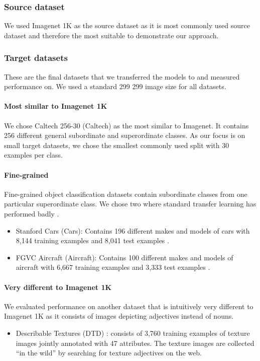 \documentclass[]{article}
\begin{document}
\subsubsection{Source dataset}

We used Imagenet 1K as the source dataset as it is most commonly used
source dataset and therefore the most suitable to demonstrate our approach.

\subsubsection{Target datasets}

These are the final datasets that we transferred the models to
and measured performance on. We used a standard 299  299
image size for all datasets.
\paragraph{Most similar to Imagenet 1K}
We chose Caltech 256-30 (Caltech) \cite{griffin2007caltech} as the most similar to Imagenet. It contains 256 different general subordinate and superordinate classes. As our focus is on small target datasets, we chose the smallest commonly used split with 30 examples per class.  

\paragraph{Fine-grained}

Fine-grained object classification datasets contain subordinate classes
from one particular superordinate class. We chose two where standard
transfer learning has performed badly \cite{guo2019spottune,kornblith2019better}.
\begin{itemize}
\item Stanford Cars (Cars): Contains 196 different makes and models of cars
with 8,144 training examples and 8,041 test examples \cite{KrauseStarkDengFei-Fei_3DRR2013}. 
\item FGVC Aircraft (Aircraft): Contains 100 different makes and models
of aircraft with 6,667 training examples and 3,333 test examples \cite{maji13fine-grained}.
\end{itemize}

\paragraph{Very different to Imagenet 1K}

We evaluated performance on another dataset that is intuitively very
different to Imagenet 1K as it consists of images depicting adjectives
instead of nouns. 
\begin{itemize}
\item Describable Textures (DTD) \cite{cimpoi2014describing}: consists
of 3,760 training examples of texture images jointly annotated with
47 attributes. The texture images are collected \textquotedblleft in
the wild\textquotedblright{} by searching for texture adjectives on
the web. 
\end{itemize}
\end{document}
